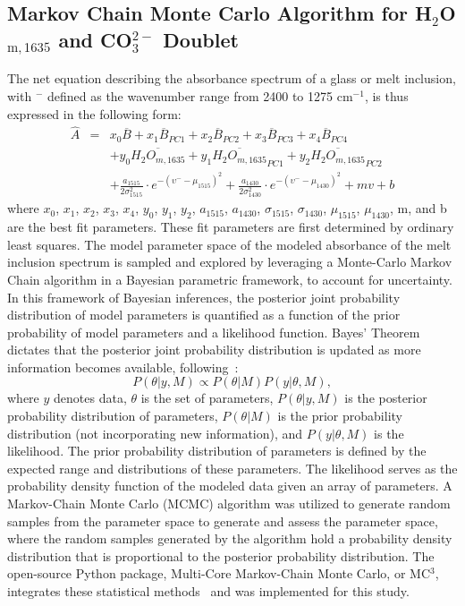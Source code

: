 \documentclass[draft]{agujournal2019}
\begin{document}
\subsection{Markov Chain Monte Carlo Algorithm for H$_{2}$O$_{\mathrm{m}, 1635}$ and  CO$_{3}^{2-}$ Doublet}

The net equation describing the absorbance spectrum of a glass or melt inclusion, with \textupsilon$^-$ defined as the wavenumber range from 2400 to 1275 cm$^{-1}$, is thus expressed in the following form:
\begin{eqnarray*}
\hat{A} & = & x_0 \overline{B} + x_1 \overline{B}_{PC1} + x_2 \overline{B}_{PC2} + x_3 \overline{B}_{PC3} + x_4 \overline{B}_{PC4} \\
    && + y_0 \overline{H_2O_{m, 1635}} + y_1 \overline{H_2O_{m, 1635}}_{PC1} + y_2 \overline{H_2O_{m, 1635}}_{PC2} \\
    && + \frac{a_{1515}}{2\sigma_{1515}^2} \cdot e^{-(\upsilon^- - \mu_{1515})^2} + \frac{a_{1430}}{2\sigma_{1430}^2} \cdot e^{-(\upsilon^- - \mu_{1430})^2} +  mv + b 
\end{eqnarray*}
where $x_{0}$, $x_{1}$, $x_{2}$, $x_{3}$, $x_{4}$, $y_{0}$, $y_{1}$, $y_{2}$, $a_{1515}$, $a_{1430}$, $\sigma_{1515}$, $\sigma_{1430}$, $\mu_{1515}$, $\mu_{1430}$, m, and b are the best fit parameters. These fit parameters are first determined by ordinary least squares. The model parameter space of the modeled absorbance of the melt inclusion spectrum is sampled and explored by leveraging a Monte-Carlo Markov Chain algorithm in a Bayesian parametric framework, to account for uncertainty. In this framework of Bayesian inferences, the posterior joint probability distribution of model parameters is quantified as a function of the prior probability of model parameters and a likelihood function. Bayes’ Theorem dictates that the posterior joint probability distribution is updated as more information becomes available, following~: 
\begin{equation}
P(\theta | y, M) \propto P(\theta | M) P(y | \theta, M),
\end{equation}
where $y$ denotes data, $\theta$ is the set of parameters, $P(\theta|y, M)$ is the posterior probability distribution of parameters, $P(\theta|M)$ is the prior probability distribution (not incorporating new information), and $P(y|\theta, M)$ is the likelihood. The prior probability distribution of parameters is defined by the expected range and distributions of these parameters. The likelihood serves as the probability density function of the modeled data given an array of parameters. A Markov-Chain Monte Carlo (MCMC) algorithm was utilized to generate random samples from the parameter space to generate and assess the parameter space, where the random samples generated by the algorithm hold a probability density distribution that is proportional to the posterior probability distribution. The open-source Python package, Multi-Core Markov-Chain Monte Carlo, or MC$^{3}$, integrates these statistical methods~\cite{Cubillosetal2017} and was implemented for this study.
\end{document}
